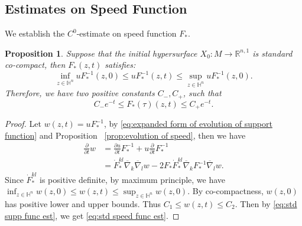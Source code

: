 \documentclass[10pt,a4paper]{amsart}
\newtheorem{proposition}[theorem]{Proposition}
\newcommand{\R}{\ensuremath{\mathbb{R}}}
\renewcommand{\H}{{\mathbb{H}}}
\newcommand{\pd}[2]{\frac{\partial {#1}}{\partial {#2}}}
\newcommand{\bnabla}{\overline{\nabla}}
\numberwithin{equation}{section}
\begin{document}
\subsection{Estimates on Speed Function}
We establish the \(C^0\)-estimate on speed function \(F_*\).
\begin{proposition}\label{prop:speed-estimate}
    Suppose that the initial hypersurface \(X_0:M\to \R^{n,1}\) is standard co-compact, then \(F_*(z,t)\) satisfies: 
    \begin{equation}
        \inf_{z\in \H^n}u F_*^{-1}(z,0) \leq u F_*^{-1}(z,t) \leq \sup_{z\in \H^n}u F_*^{-1}(z,0).
    \end{equation}
   Therefore, we have two positive constants \(C_-, C_+ \), such that  
    \begin{equation}\label{eq:std speed func est}
        C_- e^{-t} \leq F_*(\tau)(z,t) \leq C_+ e^{-t}.
    \end{equation}
\end{proposition}
\begin{proof}
    Let \(w(z,t) = uF_*^{-1}\), by \eqref{eq:expanded form of evolution of support function} and Proposition ~\ref{prop:evolution of speed}, then we have 
    \begin{equation*}
        \begin{aligned}
            \pd{}{t}w &= \pd{u}{t}F_*^{-1} + u\pd{}{t}F_*^{-1} \\
            &= \dot{F}_*^{kl}\bnabla_k \bnabla_l w - 2F_* \dot{F}_*^{kl}\bnabla_k F_*^{-1}\bnabla_l w.
        \end{aligned}
    \end{equation*}
    Since \(\dot{F}_*^{kl}\) is positive definite, by maximum principle, we have \(\inf_{z\in \H^n}w(z,0) \leq w(z,t)\leq \sup_{z\in \H^n}w(z,0)\). By co-compactness, \(w(z,0)\) has positive lower and upper bounds. Thus \(C_1\leq w(z,t) \leq C_2\). Then by \eqref{eq:std supp func est}, we get \eqref{eq:std speed func est}.
\end{proof}
\end{document}
